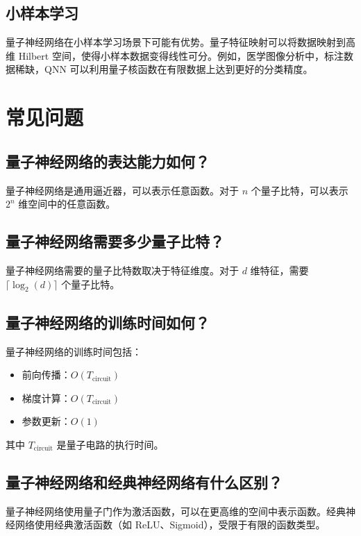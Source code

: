 \documentclass[12pt,a4paper]{article}
\begin{document}
\subsection{小样本学习}

量子神经网络在小样本学习场景下可能有优势。量子特征映射可以将数据映射到高维 Hilbert 空间，使得小样本数据变得线性可分。例如，医学图像分析中，标注数据稀缺，QNN 可以利用量子核函数在有限数据上达到更好的分类精度。

\section{常见问题}

\subsection{量子神经网络的表达能力如何？}

量子神经网络是通用逼近器，可以表示任意函数。对于 $n$ 个量子比特，可以表示 $2^n$ 维空间中的任意函数。

\subsection{量子神经网络需要多少量子比特？}

量子神经网络需要的量子比特数取决于特征维度。对于 $d$ 维特征，需要 $\lceil \log_2(d) \rceil$ 个量子比特。

\subsection{量子神经网络的训练时间如何？}

量子神经网络的训练时间包括：
\begin{itemize}
  \item 前向传播：$O(T_{\text{circuit}})$
  \item 梯度计算：$O(T_{\text{circuit}})$
  \item 参数更新：$O(1)$
\end{itemize}

其中 $T_{\text{circuit}}$ 是量子电路的执行时间。

\subsection{量子神经网络和经典神经网络有什么区别？}

量子神经网络使用量子门作为激活函数，可以在更高维的空间中表示函数。经典神经网络使用经典激活函数（如 ReLU、Sigmoid），受限于有限的函数类型。
\end{document}

